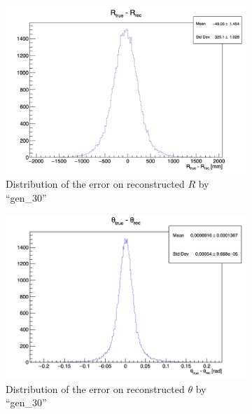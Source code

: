 \documentclass[../main.tex]{subfiles}
\begin{document}
\begin{figure}[ht]
  \begin{subfigure}[t]{0.32\linewidth}
    \centering
    \includegraphics[width=\linewidth]{images/jcnn/vic_cnn/cnn_delta_r.png}
    \caption{Distribution of the error on reconstructed $R$ by ``gen\_30''}
    \label{fig:jcnn:vic_cnn:cnn_delta_r}
  \end{subfigure}
  \begin{subfigure}[t]{0.32\linewidth}
    \centering
    \includegraphics[width=\linewidth]{images/jcnn/vic_cnn/cnn_delta_theta.png}
    \caption{Distribution of the error on reconstructed $\theta$ by ``gen\_30''}
    \label{fig:jcnn:vic_cnn:cnn_delta_theta}
  \end{subfigure}
  \begin{subfigure}[t]{0.32\linewidth}
    \centering

\end{subfigure}
\end{figure}
\end{document}

